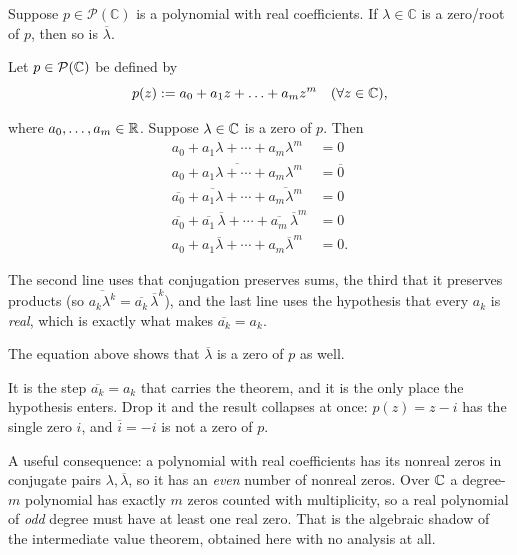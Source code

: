 \begin{thm}
  \label{thm: polynomials with real coefficients have nonreal zeros in pairs}
  Suppose $p\in \mathcal{P} (\mathbb{C})$ is a polynomial with real coefficients. If $\lambda \in \mathbb{C}$ is a zero/root of $p$, then so is $\overline{\lambda}$.
\end{thm}
\begin{prf}
  Let $p \in \mathcal{P}(\mathbb{C})$ be defined by
  \begin{equation}
    p(z) := a_0 + a_1 z + \ldots + a_m z^m \quad (\forall z \in  \mathbb{C}),
  \end{equation}

  where $a_0, \ldots, a_m \in \mathbb{R}$. Suppose $\lambda \in \mathbb{C}$ is a zero of $p$. Then
  \begin{equation}
    \begin{aligned}
      a_0+a_1\lambda+\cdots+a_m\lambda^m&=0\\
      \overline{a_0+a_1\lambda+\cdots+a_m\lambda^m}&=\overline{0}\\
      \overline{a_0}+\overline{a_1\lambda}+\cdots+\overline{a_m\lambda^m}&=0\\
      \overline{a_0}+\overline{a_1}\,\overline{\lambda}+\cdots+\overline{a_m}\,\overline{\lambda}^m&=0\\
      a_0+a_1\overline{\lambda}+\cdots+a_m\overline{\lambda}^m&=0.
    \end{aligned}
  \end{equation}

  The second line uses that conjugation preserves sums, the third that it preserves products (so $\overline{a_k \lambda^k} = \overline{a_k}\,\overline{\lambda}^k$), and the last line uses the hypothesis that every $a_k$ is \emph{real}, which is exactly what makes $\overline{a_k} = a_k$.

  The equation above shows that $\overline{\lambda}$ is a zero of $p$ as well.
\end{prf}

\begin{ainote}
  It is the step $\overline{a_k} = a_k$ that carries the theorem, and it is the only place the hypothesis enters. Drop it and the result collapses at once: $p(z) = z - i$ has the single zero $i$, and $\overline{i} = -i$ is not a zero of $p$.

  A useful consequence: a polynomial with real coefficients has its nonreal zeros in conjugate pairs $\lambda, \overline{\lambda}$, so it has an \emph{even} number of nonreal zeros. Over $\mathbb{C}$ a degree-$m$ polynomial has exactly $m$ zeros counted with multiplicity, so a real polynomial of \emph{odd} degree must have at least one real zero. That is the algebraic shadow of the intermediate value theorem, obtained here with no analysis at all.
\end{ainote}

